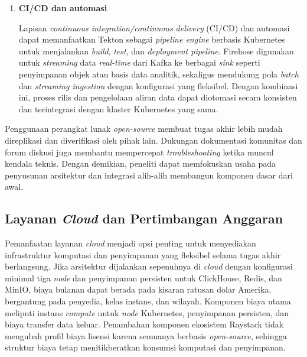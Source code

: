 \begin{enumerate}
    \item \textbf{CI/CD dan automasi}
    
    Lapisan \textit{continuous integration/continuous delivery} (CI/CD) dan automasi dapat memanfaatkan Tekton sebagai \textit{pipeline engine} berbasis Kubernetes untuk menjalankan \textit{build}, \textit{test}, dan \textit{deployment pipeline}. Firehose digunakan untuk \textit{streaming} data \textit{real-time} dari Kafka ke berbagai \textit{sink} seperti penyimpanan objek atau basis data analitik, sekaligus mendukung pola \textit{batch} dan \textit{streaming ingestion} dengan konfigurasi yang fleksibel. Dengan kombinasi ini, proses rilis dan pengelolaan aliran data dapat diotomasi secara konsisten dan terintegrasi dengan klaster Kubernetes yang sama.
    
    \vspace{0.5em}
\end{enumerate}

Penggunaan perangkat lunak \textit{open-source} membuat tugas akhir lebih mudah direplikasi dan diverifikasi oleh pihak lain. Dukungan dokumentasi komunitas dan forum diskusi juga membantu mempercepat \textit{troubleshooting} ketika muncul kendala teknis. Dengan demikian, peneliti dapat memfokuskan usaha pada penyusunan arsitektur dan integrasi alih-alih membangun komponen dasar dari awal.

\subsection{Layanan \textit{Cloud} dan Pertimbangan Anggaran}

Pemanfaatan layanan \textit{cloud} menjadi opsi penting untuk menyediakan infrastruktur komputasi dan penyimpanan yang fleksibel selama tugas akhir berlangsung. Jika arsitektur dijalankan sepenuhnya di \textit{cloud} dengan konfigurasi minimal tiga \textit{node} dan penyimpanan persisten untuk ClickHouse, Redis, dan MinIO, biaya bulanan dapat berada pada kisaran ratusan dolar Amerika, bergantung pada penyedia, kelas instans, dan wilayah. Komponen biaya utama meliputi instans \textit{compute} untuk \textit{node} Kubernetes, penyimpanan persisten, dan biaya transfer data keluar. Penambahan komponen ekosistem Raystack tidak mengubah profil biaya lisensi karena semuanya berbasis \textit{open-source}, sehingga struktur biaya tetap menitikberatkan konsumsi komputasi dan penyimpanan.

